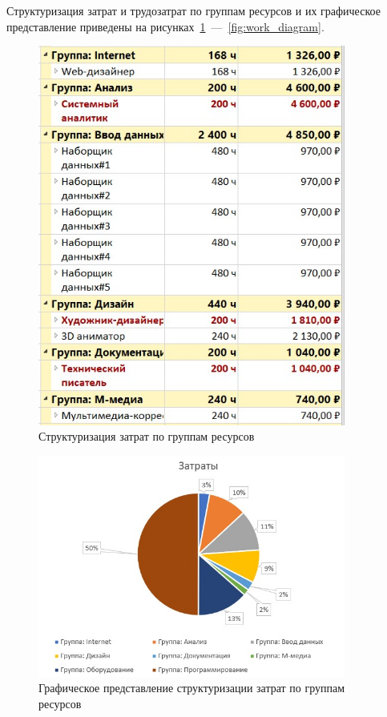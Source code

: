 Структуризация затрат и трудозатрат по группам ресурсов и их графическое представление приведены на рисунках~\ref{fig:group}~---~\ref{fig:work_diagram}.

\begin{figure}[H]
	\centering
	\includegraphics[width=0.9\textwidth]{img/task3/group.jpg}
	\caption{Структуризация затрат по группам ресурсов}
	\label{fig:group}
\end{figure}

\begin{figure}[H]
	\centering
	\includegraphics[width=0.9\textwidth]{img/task3/diagram.jpg}
	\caption{Графическое представление структуризации затрат по группам ресурсов}
	\label{fig:graphic_group}
\end{figure}

